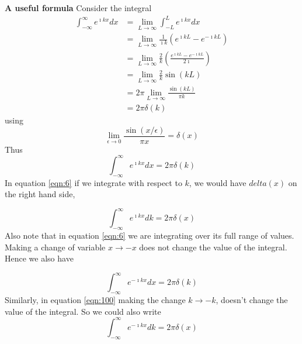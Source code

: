 		\textbf{A useful formula}
		Consider the integral
		\begin{eqnarray}
			\int_{-\infty}^{\infty} e^{\imath k x} dx 
			&= \lim\limits_{L \rightarrow \infty} \int_{-L}^{L} e^{\imath k x} dx \nonumber \\
			&= \lim\limits_{L \rightarrow \infty} \frac{1}{\imath k} \left(e^{\imath k L} - e^{-\imath k L}\right) \nonumber \\
			&= \lim\limits_{L \rightarrow \infty} \frac{2}{k} \left(\frac{e^{\imath k L} - e^{-\imath k L}}{2\imath}\right) \nonumber \\
			&= \lim\limits_{L \rightarrow \infty} \frac{2}{k} \sin(k L) \nonumber \\
			&= 2\pi \lim\limits_{L \rightarrow \infty} \frac{\sin(k L
				)}{\pi k} \nonumber \\
			&= 2\pi \delta(k)
		\end{eqnarray}
		using 
		\begin{equation}
			\lim\limits_{\epsilon \rightarrow 0} \frac{\sin(x /\epsilon
				)}{\pi x} = \delta(x)
		\end{equation}
		Thus
		\begin{equation}\label{eqn:6}
			\int_{-\infty}^{\infty} e^{\imath k x} dx = 2\pi \delta(k)
		\end{equation}
		In equation \ref{eqn:6} if we integrate with respect to $k$, we would have $delta(x)$ on the right hand side,
	
	
		\begin{equation}\label{eqn:100}
		\int_{-\infty}^{\infty} e^{\imath k x} dk = 2\pi \delta(x)
		\end{equation}
		Also note that in equation \ref{eqn:6} we are integrating over its full range of values. Making a change of variable $x \rightarrow -x$ does not change the value of the integral. Hence we also have
		
		\begin{equation}\label{eqn:101}
		\int_{-\infty}^{\infty} e^{-\imath k x} dx = 2\pi \delta(k)
		\end{equation}
		Similarly, in equation \ref{eqn:100} making the change $k \rightarrow -k$, doesn't change the value of the integral. So we could also write
		\begin{equation}\label{eqn:102}
		\int_{-\infty}^{\infty} e^{-\imath k x} dk = 2\pi \delta(x)
		\end{equation}
		
